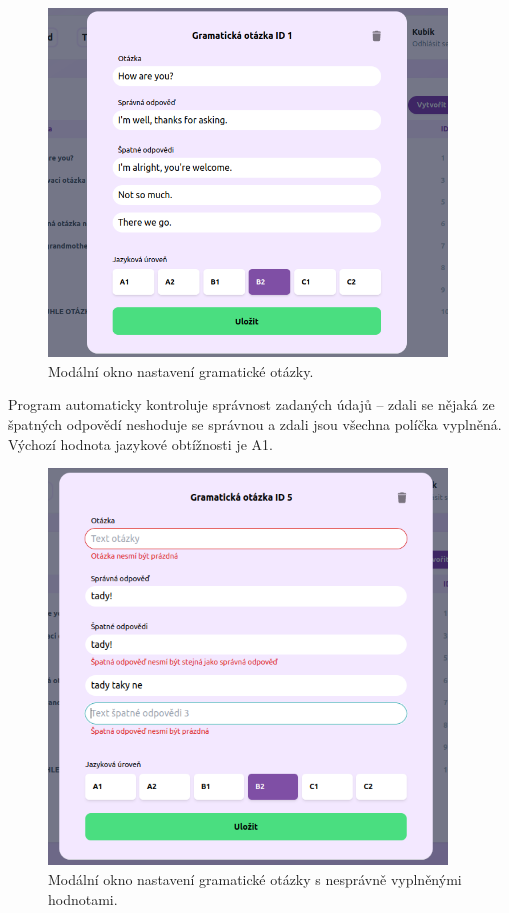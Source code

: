 \begin{figure}[H]
    \centering
    \includegraphics[width=400px]{images/01design/question.png}
    \caption{Modální okno nastavení gramatické otázky.}
    \label{questionfill}
\end{figure}

Program automaticky kontroluje správnost zadaných údajů -- zdali se nějaká ze špatných odpovědí neshoduje se správnou a zdali jsou všechna políčka vyplněná. Výchozí hodnota jazykové obtížnosti je A1.

\begin{figure}[H]
    \centering
    \includegraphics[width=400px]{images/01design/question-bad.png}
    \caption{Modální okno nastavení gramatické otázky s nesprávně vyplněnými hodnotami.}
\end{figure}

